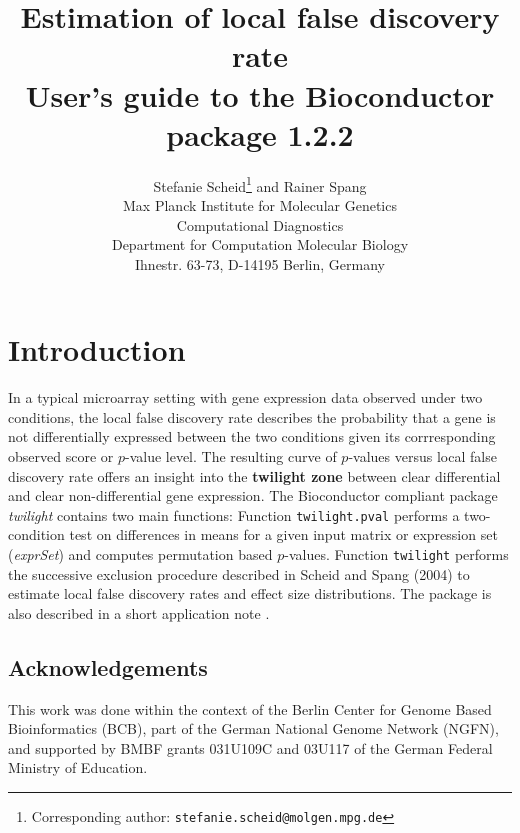 \documentclass[11pt,a4paper,fleqn]{report}
\title{Estimation of local false discovery rate \bigskip \\ User's guide to the Bioconductor package \Rpackage{twilight} 1.2.2}
\author{Stefanie Scheid\footnote{Corresponding author: 
        \texttt{stefanie.scheid@molgen.mpg.de}}
        and Rainer Spang \bigskip \\
        \small Max Planck Institute for Molecular Genetics\\ 
         Computational Diagnostics\\ Department for Computation Molecular Biology \\
         Ihnestr. 63-73, D-14195 Berlin, Germany}
\date{}
\newcommand{\Rfunction}[1]{{\texttt{#1}}}
\newcommand{\Rpackage}[1]{{\textit{#1}}}
\newcommand{\Rclass}[1]{{\textit{#1}}}
\begin{document}
\maketitle



\chapter{Introduction}

In a typical microarray setting with gene expression data observed under two conditions, the local false discovery rate describes the probability that a gene is not differentially expressed between the two conditions given its corrresponding observed score or $p$-value level. The resulting curve of $p$-values versus local false discovery rate offers an insight into the \textbf{twilight zone} between clear differential and clear non-differential gene expression. The Bioconductor compliant package \Rpackage{twilight} contains two main functions: Function \Rfunction{twilight.pval} performs a two-condition test on differences in means for a given input matrix or expression set (\Rclass{exprSet}) and computes permutation based $p$-values. Function \Rfunction{twilight} performs the successive exclusion procedure described in Scheid and Spang (2004) \cite{scheid04} to estimate local false discovery rates and effect size distributions. The package is also described in a short application note \cite{scheid05}.



\section*{Acknowledgements}

This work was done within the context of the Berlin Center for Genome Based Bioinformatics (BCB), part of the German National Genome Network (NGFN), and supported by BMBF grants 031U109C and 03U117 of the German Federal Ministry of Education.



\end{document}
